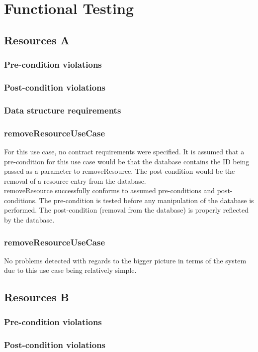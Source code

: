 \documentclass[a4paper]{article}
\begin{document}
\section {Functional Testing}

\subsection {Resources A}
\subsubsection {Pre-condition violations}
\subsubsection {Post-condition violations}
\subsubsection {Data structure requirements}
\subsubsection{removeResourceUseCase}
For this use case, no contract requirements were specified. It is assumed that a pre-condition for this use case would be that the database contains the ID being passed as a parameter to removeResource. The post-condition would be the removal of a resource entry from the database.
\\
removeResource successfully conforms to assumed pre-conditions and post-conditions. The pre-condition is tested before any manipulation of the database is performed. The post-condition (removal from the database) is properly reflected by the database.
\subsubsection{removeResourceUseCase}
No problems detected with regards to the bigger picture in terms of the system due to this use case being relatively simple.

\subsection {Resources B}
\subsubsection {Pre-condition violations}
\subsubsection {Post-condition violations}
\end{document}
